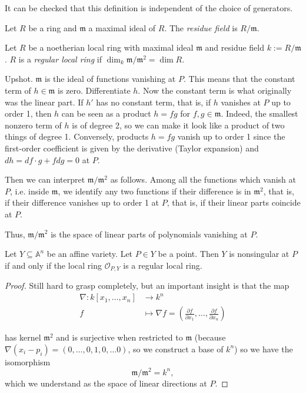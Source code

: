 \noindent
It can be checked that this definition is
independent of the choice of generators.

\begin{definition}
\label{definition-residue-field}
Let $R$ be a ring and $\mathfrak{m}$ a
maximal ideal of $R$.
The {\it residue field} is  $R/\mathfrak{m}$.
\end{definition}

\begin{definition}
\label{definition-regular-local-ring}
Let $R$ be a noetherian local ring with
maximal ideal $\mathfrak{m}$
and residue field $k:=R/\mathfrak{m}$.
$R$ is a {\it regular local ring} if
$\dim_k \mathfrak{m}/\mathfrak{m}^2=\dim R$.
\end{definition}

\noindent
Upshot. $\mathfrak{m}$ is the ideal of
functions vanishing at $P$.
This means that the constant term of $h \in
\mathfrak{m}$ is zero.
Differentiate $h$.
Now the constant term is what originally was
the linear part.
If $h'$ has no constant term, that is, if $h$
vanishes at $P$
up to order 1,
then $h$ can be seen as a product $h=fg$ for
$f,g \in \mathfrak{m}$.
Indeed, the smallest nonzero term of $h$ is
of degree 2,
so we can make it look like a product of two
things of degree 1.
Conversely, products $h=fg$ vanish up to
order 1 since
the first-order coefficient is given by the
derivative
(Taylor expansion)
and $dh=df\cdot g+fdg =0$ at $P$.

Then we can interpret
$\mathfrak{m}/\mathfrak{m}^2$ as follows.
Among all the functions which vanish at $P$,
i.e. inside $\mathfrak{m}$,
we identify any two functions if their
difference
is in $\mathfrak{m}^2$,
that is, if their difference vanishes up to
order 1 at $P$,
that is, if their linear parts coincide at
$P$.

Thus, $\mathfrak{m}/\mathfrak{m}^2$ is the
space
of linear parts of polynomials vanishing at
$P$.

\begin{theorem}
\label{theorem-nonsi-jacob-iff-regul-local}
Let $Y \subseteq \mathbb{A}^n$ be an affine
variety.
Let $P \in Y$ be a point.
Then $Y$ is nonsingular at $P$
if and only if
the local ring $\mathcal{O}_{P,Y}$ is a
regular local ring.
\end{theorem}

\begin{proof}
Still hard to grasp completely,
but an important insight is that the map
$$
\begin{aligned}
\nabla: k[x_1,…,x_n]  &\longrightarrow k^n \\
 f &\longmapsto \nabla f=\left(\frac{\partial
 f}{\partial x_1},
…,\frac{\partial f}{\partial x_n}\right)
\end{aligned}
$$

\noindent
has kernel $\mathfrak{m}^2$ and is surjective
when restricted to $\mathfrak{m}$
(because $\nabla(x_i-p_i)=(0,…,0,1,0,…0)$, so
we construct a base of $k^n$)
so we have the isomorphism
$$
\mathfrak{m}/\mathfrak{m}^2=k^n,
$$
which we understand as the space of linear
directions at $P$.
\end{proof}

